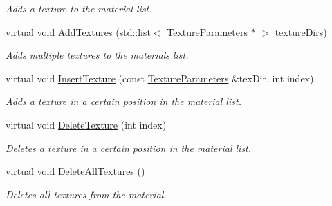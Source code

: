 \begin{DoxyCompactItemize}
\begin{DoxyCompactList}\small\item\em Adds a texture to the material list. \end{DoxyCompactList}\item 
\mbox{\label{class_geometry_engine_1_1_geometry_material_1_1_texture_material_acd13e76d7d89fa8b1fb605b99333736c}} 
virtual void \mbox{\hyperlink{class_geometry_engine_1_1_geometry_material_1_1_texture_material_acd13e76d7d89fa8b1fb605b99333736c}{Add\+Textures}} (std\+::list$<$ \mbox{\hyperlink{class_geometry_engine_1_1_geometry_material_1_1_texture_parameters}{Texture\+Parameters}} $\ast$ $>$ texture\+Dirs)
\begin{DoxyCompactList}\small\item\em Adds multiple textures to the materials list. \end{DoxyCompactList}\item 
\mbox{\label{class_geometry_engine_1_1_geometry_material_1_1_texture_material_a1ce43913d0980e1e888b7100dae2eac1}} 
virtual void \mbox{\hyperlink{class_geometry_engine_1_1_geometry_material_1_1_texture_material_a1ce43913d0980e1e888b7100dae2eac1}{Insert\+Texture}} (const \mbox{\hyperlink{class_geometry_engine_1_1_geometry_material_1_1_texture_parameters}{Texture\+Parameters}} \&tex\+Dir, int index)
\begin{DoxyCompactList}\small\item\em Adds a texture in a certain position in the material list. \end{DoxyCompactList}\item 
\mbox{\label{class_geometry_engine_1_1_geometry_material_1_1_texture_material_a5ea386637b7cf98fcd7bacba90c3a459}} 
virtual void \mbox{\hyperlink{class_geometry_engine_1_1_geometry_material_1_1_texture_material_a5ea386637b7cf98fcd7bacba90c3a459}{Delete\+Texture}} (int index)
\begin{DoxyCompactList}\small\item\em Deletes a texture in a certain position in the material list. \end{DoxyCompactList}\item 
\mbox{\label{class_geometry_engine_1_1_geometry_material_1_1_texture_material_ae4d935c624892c7bba5ce82c7c78b3ba}} 
virtual void \mbox{\hyperlink{class_geometry_engine_1_1_geometry_material_1_1_texture_material_ae4d935c624892c7bba5ce82c7c78b3ba}{Delete\+All\+Textures}} ()
\begin{DoxyCompactList}\small\item\em Deletes all textures from the material. \end{DoxyCompactList}\end{DoxyCompactItemize}
